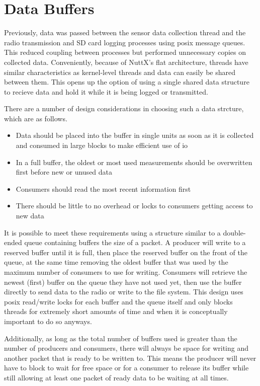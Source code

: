 \section{Data Buffers}

Previously, data was passed between the sensor data collection thread and the radio transmission and SD card logging
processes using \gls{posix} message queues. This reduced coupling between processes but performed unnecessary copies on
collected data.  Conveniently, because of NuttX's flat architecture, threads have similar characteristics as kernel-level
threads and data can easily be shared between them. \cite{nuttx-pthread} This opens up the option of using a single shared
data structure to recieve data and hold it while it is being logged or transmitted.

There are a number of design considerations in choosing such a data strcture, which are as follows.

\begin{itemize}
    \item Data should be placed into the buffer in single units as soon as it is collected and consumed in large blocks to
          make efficient use of \gls{io}
    \item In a full buffer, the oldest or most used measurements should be overwritten first before new or unused data
    \item Consumers should read the most recent information first
    \item There should be little to no overhead or locks to consumers getting access to new data
\end{itemize}

It is possible to meet these requirements using a structure similar to a double-ended queue containing buffers the size
of a packet. A producer will write to a reserved buffer until it is full, then place the reserved buffer on the front of the
queue, at the same time removing the oldest buffer that was used by the maximum number of consumers to use for writing.
Consumers will retrieve the newest (first) buffer on the queue they have not used yet, then use the buffer directly to
send data to the radio or write to the file system. This design uses \gls{posix} read/write locks for each buffer and
the queue itself and only blocks threads for extremely short amounts of time and when it is conceptually important to do
so anyways.

Additionally, as long as the total number of buffers used is greater than the number of producers and consumers, there
will always be space for writing and another packet that is ready to be written to. This means the producer will never
have to block to wait for free space or for a consumer to release its buffer while still allowing at least one packet of
ready data to be waiting at all times.


